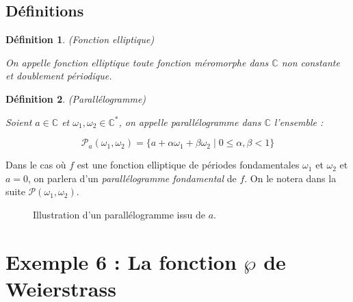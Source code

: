 \documentclass[12pt]{article}
\newtheorem{definition}{Définition}
\begin{document}
    \subsection{Définitions }
    \begin{definition}(Fonction elliptique)
    
    On appelle \textit{fonction elliptique} toute fonction méromorphe dans $\mathbb{C}$ non constante et doublement périodique.
    \end{definition}
    \begin{definition}(Parallélogramme)
    
    Soient $a \in \mathbb{C}$ et $\omega_1, \omega_2 \in \mathbb{C}^{*}$, on appelle \textit{parallélogramme} dans $\mathbb{C}$ l’ensemble :
    
    \[
\mathcal{P}_{a}{(\omega_1, \omega_2)} = \{ a + \alpha \omega_1 + \beta \omega_2 \mid 0 \leq \alpha, \beta < 1 \}
\]
\end{definition}
    
    Dans le cas où $f$ est une fonction elliptique de périodes fondamentales $\omega_1$ et $\omega_2$ et $a = 0$, on parlera d’un \textit{parallélogramme fondamental} de $f$. On le notera dans la suite $\mathcal{P}{(\omega_1, \omega_2)}$.
    
    \begin{center}
        \begin{figure}[h]
            \centering
            \caption{Illustration d’un parallélogramme issu de $a$.}
        \end{figure}
\end{center}

\newpage
 
 	\section*{\textbf{Exemple 6 :} La fonction \(\wp\) de Weierstrass}
 
\end{document}
